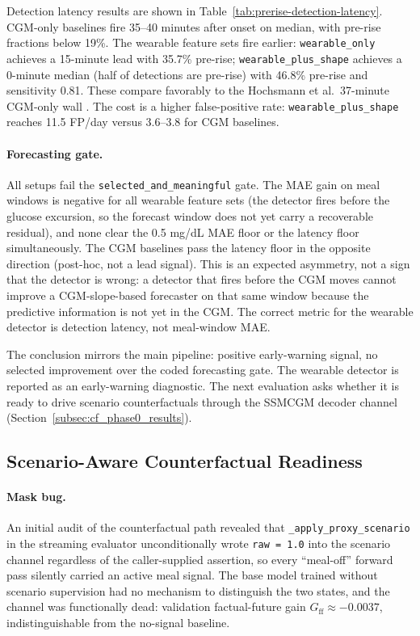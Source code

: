 Detection latency results are shown in Table~\ref{tab:prerise-detection-latency}. CGM-only baselines fire 35--40 minutes after onset on median, with pre-rise fractions below 19\%. The wearable feature sets fire earlier: \texttt{wearable\_only} achieves a 15-minute lead with 35.7\% pre-rise; \texttt{wearable\_plus\_shape} achieves a 0-minute median (half of detections are pre-rise) with 46.8\% pre-rise and sensitivity 0.81. These compare favorably to the Hochsmann et al.\ 37-minute CGM-only wall \citep{hochsmann2022detection}. The cost is a higher false-positive rate: \texttt{wearable\_plus\_shape} reaches 11.5 FP/day versus 3.6--3.8 for CGM baselines.

\paragraph{Forecasting gate.}
All setups fail the \texttt{selected\_and\_meaningful} gate. The MAE gain on meal windows is negative for all wearable feature sets (the detector fires before the glucose excursion, so the forecast window does not yet carry a recoverable residual), and none clear the 0.5 mg/dL MAE floor or the latency floor simultaneously. The CGM baselines pass the latency floor in the opposite direction (post-hoc, not a lead signal). This is an expected asymmetry, not a sign that the detector is wrong: a detector that fires before the CGM moves cannot improve a CGM-slope-based forecaster on that same window because the predictive information is not yet in the CGM. The correct metric for the wearable detector is detection latency, not meal-window MAE.

The conclusion mirrors the main pipeline: positive early-warning signal, no selected improvement over the coded forecasting gate. The wearable detector is reported as an early-warning diagnostic. The next evaluation asks whether it is ready to drive scenario counterfactuals through the SSMCGM decoder channel (Section~\ref{subsec:cf_phase0_results}).

\subsection{Scenario-Aware Counterfactual Readiness}
\label{subsec:cf_scenario_retrain}

\paragraph{Mask bug.}
An initial audit of the counterfactual path revealed that \texttt{\_apply\_proxy\_scenario} in the streaming evaluator unconditionally wrote \texttt{raw = 1.0} into the scenario channel regardless of the caller-supplied assertion, so every ``meal-off'' forward pass silently carried an active meal signal. The base model trained without scenario supervision had no mechanism to distinguish the two states, and the channel was functionally dead: validation factual-future gain $G_{\mathrm{ff}} \approx -0.0037$, indistinguishable from the no-signal baseline.

